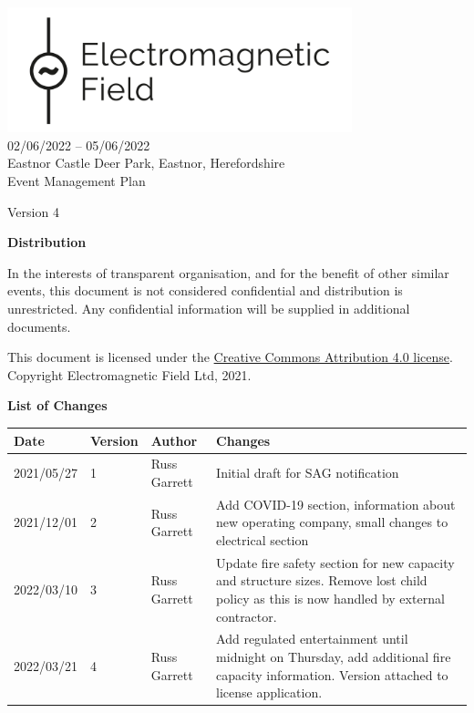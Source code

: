 

\newcommand{\st}{\textsuperscript{st} }
\newcommand{\nd}{\textsuperscript{nd} }
\renewcommand{\th}{\textsuperscript{th} }
\newcommand{\rd}{\textsuperscript{rd} }
\newcommand{\sq}{\textsuperscript{2}}




\begin{titlepage}
\thispagestyle{empty}
\begin{center}
    \includegraphics[width=10cm]{../resources/emf-logo.png}\\[24pt]
    {\LARGE 02/06/2022 -- 05/06/2022} \\[16pt]
    {\Large Eastnor Castle Deer Park, Eastnor, Herefordshire} \\[48pt]

    {\Large Event Management Plan}

    Version 4

    \vfill

    \begin{framed}
        \textbf{Distribution}

        In the interests of transparent organisation, and for the benefit of other similar events,
        this document is not considered confidential and distribution is unrestricted.
        Any confidential information will be supplied in additional documents.
        
        \footnotesize{This document is licensed under the
        \href{https://creativecommons.org/licenses/by/4.0/}{Creative Commons Attribution 4.0 license}.
	Copyright Electromagnetic Field Ltd, 2021.}
    \end{framed}

    \textbf{List of Changes}
    \begin{tabular}{l | l | l | p{10cm}}
      Date & Version & Author & Changes \\
      \hline
      2021/05/27 & 1 & Russ Garrett & Initial draft for SAG notification \\
      2021/12/01 & 2 & Russ Garrett & Add COVID-19 section, information about new operating company, small changes to electrical section \\
      2022/03/10 & 3 & Russ Garrett & Update fire safety section for new capacity and structure sizes. Remove lost child policy as this
                                      is now handled by external contractor. \\
      2022/03/21 & 4 & Russ Garrett & Add regulated entertainment until midnight on Thursday, add additional fire capacity information.
                                      Version attached to license application.
    \end{tabular}
\end{center}
\end{titlepage}
\setcounter{page}{2}

\tableofcontents

\newpage



